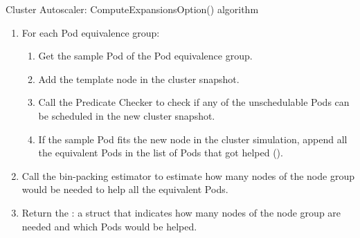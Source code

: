 \begin{algorithm}[ht]
    \caption{Cluster Autoscaler: ComputeExpansionsOption()
        algorithm}\label{algorithm:scaleup-options}  
    \begin{enumerate}[leftmargin=0.5cm]
        \tightlist
        \item
              For each Pod equivalence group:
              \begin{enumerate}
                  \tightlist
                  \item Get the sample Pod of the Pod equivalence group.
                  \item Add the template node in the cluster snapshot.
                  \item Call the Predicate Checker to check if any of the
                        unschedulable Pods can be scheduled in the new cluster snapshot.
                  \item If the sample Pod fits the new node in the cluster
                        simulation, append all the equivalent Pods in the list of Pods
                        that got helped ().
              \end{enumerate}
        \item Call the bin-packing estimator to estimate how many nodes of
              the node group would be needed to help all the equivalent Pods.
        \item Return the : a struct that indicates how many nodes of
              the node group are needed and which Pods would be helped.
    \end{enumerate}
\end{algorithm}

